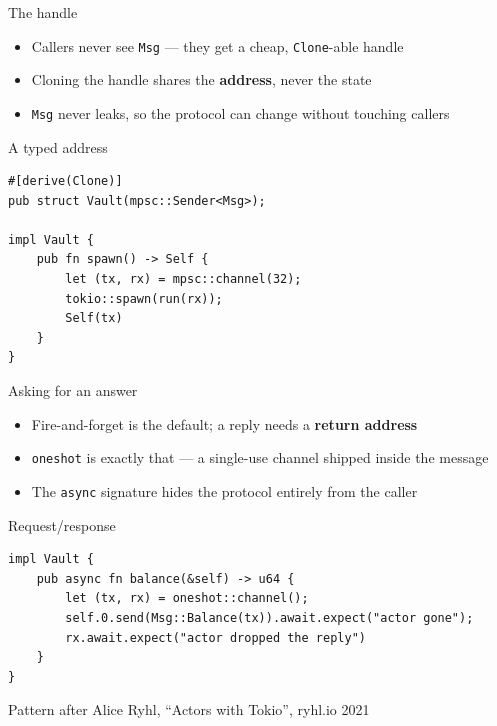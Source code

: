 \begin{frame}[fragile]{The handle}
  \begin{itemize}
    \item Callers never see \texttt{Msg} --- they get a cheap, \texttt{Clone}-able handle
    \item Cloning the handle shares the \textbf{address}, never the state
    \item \texttt{Msg} never leaks, so the protocol can change without touching callers
  \end{itemize}
  \vspace{-0.25cm}
  \begin{block}{A typed address}
\begin{lstlisting}
#[derive(Clone)]
pub struct Vault(mpsc::Sender<Msg>);

impl Vault {
    pub fn spawn() -> Self {
        let (tx, rx) = mpsc::channel(32);
        tokio::spawn(run(rx));
        Self(tx)
    }
}
\end{lstlisting}
  \end{block}
\end{frame}

\begin{frame}[fragile]{Asking for an answer}
  \begin{itemize}
    \item Fire-and-forget is the default; a reply needs a \textbf{return address}
    \item \texttt{oneshot} is exactly that --- a single-use channel shipped inside the message
    \item The \texttt{async} signature hides the protocol entirely from the caller
  \end{itemize}
  \begin{block}{Request/response}
\begin{lstlisting}
impl Vault {
    pub async fn balance(&self) -> u64 {
        let (tx, rx) = oneshot::channel();
        self.0.send(Msg::Balance(tx)).await.expect("actor gone");
        rx.await.expect("actor dropped the reply")
    }
}
\end{lstlisting}
  \end{block}
  \vspace{-0.15cm}
  \textcolor{stplmuted}{\tiny Pattern after Alice Ryhl, ``Actors with Tokio'', ryhl.io \textperiodcentered{} 2021}
\end{frame}

